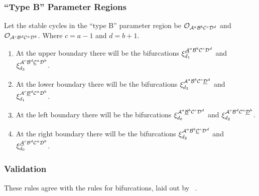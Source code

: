 \subsubsection{``Type B'' Parameter Regions}

Let the stable cycles in the ``type B'' parameter region be $\mathcal{O}_{\mathcal{A}^a\mathcal{B}^b\mathcal{C}^c\mathcal{D}^d}$ and $\mathcal{O}_{\mathcal{A}^c\mathcal{B}^d\mathcal{C}^a\mathcal{D}^b}$.
Where $c = a - 1$ and $d = b + 1$.

\begin{enumerate}
	\item At the upper boundary there will be the bifurcations $\xi_{d_1}^{\underline{\mathcal{A}}^a\mathcal{B}^b\mathcal{C}^c\mathcal{D}^d}$ and $\xi_{d_3}^{\mathcal{A}^c\mathcal{B}^d\underline{\mathcal{C}}^a\mathcal{D}^b}$.
	\item At the lower boundary there will be the bifurcations $\xi_{d_3}^{\mathcal{A}^a\mathcal{B}^b\mathcal{C}^c\underline{\mathcal{D}}^d}$ and $\xi_{d_1}^{\mathcal{A}^c\underline{\mathcal{B}}^d\mathcal{C}^a\mathcal{D}^b}$.
	\item At the left boundary there will be the bifurcations $\xi_{d_0}^{\mathcal{A}^a\underline{\mathcal{B}}^b\mathcal{C}^c\mathcal{D}^d}$ and $\xi_{d_2}^{\mathcal{A}^c\mathcal{B}^d\mathcal{C}^a\underline{\mathcal{D}}^b}$.
	\item At the right boundary there will be the bifurcations $\xi_{d_2}^{\mathcal{A}^a\mathcal{B}^b\underline{\mathcal{C}}^c\mathcal{D}^d}$ and $\xi_{d_0}^{\underline{\mathcal{A}}^c\mathcal{B}^d\mathcal{C}^a\mathcal{D}^b}$.
\end{enumerate}

\subsubsection{Validation}

These rules agree with the rules for bifurcations, laid  out by ~\cite{akyuz2022}.

